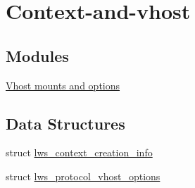 \hypertarget{group__context-and-vhost}{}\section{Context-\/and-\/vhost}
\label{group__context-and-vhost}
\subsection*{Modules}
\begin{DoxyCompactItemize}
\item 
\hyperlink{group__vhost-mounts}{Vhost mounts and options}
\end{DoxyCompactItemize}
\subsection*{Data Structures}
\begin{DoxyCompactItemize}
\item 
struct \hyperlink{structlws__context__creation__info}{lws\+\_\+context\+\_\+creation\+\_\+info}
\item 
struct \hyperlink{structlws__protocol__vhost__options}{lws\+\_\+protocol\+\_\+vhost\+\_\+options}
\end{DoxyCompactItemize}
